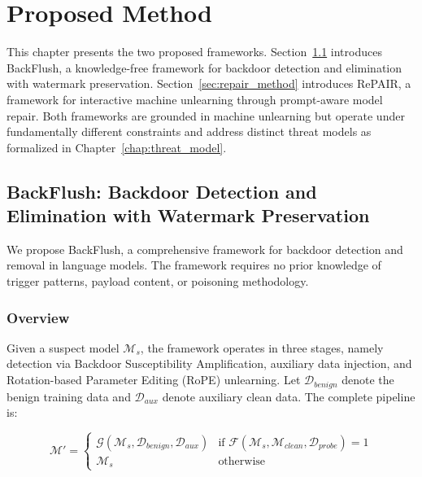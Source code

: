 \chapter{Proposed Method}
\label{chap:method}

This chapter presents the two proposed frameworks. Section~\ref{sec:backflush_method} introduces BackFlush, a knowledge-free framework for backdoor detection and elimination with watermark preservation. Section~\ref{sec:repair_method} introduces RePAIR, a framework for interactive machine unlearning through prompt-aware model repair. Both frameworks are grounded in machine unlearning but operate under fundamentally different constraints and address distinct threat models as formalized in Chapter~\ref{chap:threat_model}.


\section{BackFlush: Backdoor Detection and Elimination with Watermark Preservation}\label{sec:backflush_method}

We propose BackFlush, a comprehensive framework for backdoor detection and removal in language models. The framework requires no prior knowledge of trigger patterns, payload content, or poisoning methodology.

\subsection{Overview}\label{subsec:bf_overview}

Given a suspect model $\mathcal{M}_s$, the framework operates in three stages, namely detection via Backdoor Susceptibility Amplification, auxiliary data injection, and Rotation-based Parameter Editing (RoPE) unlearning. Let $\mathcal{D}_{\textit{benign}}$ denote the benign training data and $\mathcal{D}_{\textit{aux}}$ denote auxiliary clean data. The complete pipeline is:

\begin{equation}
\mathcal{M}' = 
\begin{cases}
\mathcal{G}(\mathcal{M}_s, \mathcal{D}_{\textit{benign}}, \mathcal{D}_{\textit{aux}}) & \text{if } \mathcal{F}(\mathcal{M}_s, \mathcal{M}_{\textit{clean}}, \mathcal{D}_{\textit{probe}}) = 1 \\
\mathcal{M}_s & \text{otherwise}
\end{cases}
\end{equation}

